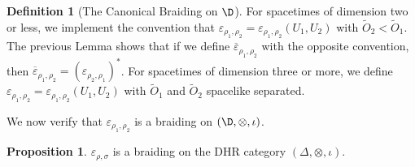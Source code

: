 \documentclass[11pt]{article}
\newenvironment{bxd}%
  {\bigskip\noindent\begin{Sbox}\begin{minipage}{0.9\textwidth} }%
  {\end{minipage}\end{Sbox}\fbox{\TheSbox}\bigskip}%
\theoremstyle{definition}
\newtheorem{prop}[thm]{Proposition}
\theoremstyle{definition}
\newtheorem{defn}[thm]{Definition}
\theoremstyle{remark}
\newcommand{\ve}{\varepsilon}
\def\wt#1{{\tilde #1}}
\def\ol#1{{\overline #1}}
\begin{document}
\begin{bxd}
  \begin{defn}[The Canonical Braiding on $\D$] For spacetimes of dimension two or
    less, we implement the convention that $\ve _{\rho _1,\rho _2}=\ve _{\rho _1,\rho
      _2}(U_1,U_2)$ with $\wt O_2<\wt O_1$.  The previous Lemma shows that if we
    define $\ol\ve _{\rho _1,\rho _2}$ with the opposite convention, then $\ol\ve
    _{\rho _1,\rho _2}=(\ve _{\rho _2,\rho _1})^*$.  For spacetimes of dimension
    three or more, we define $\ve _{\rho _1,\rho _2}=\ve _{\rho _1,\rho _2}(U_1,U_2)$
    with $\wt O_1$ and $\wt O_2$ spacelike separated.
\end{defn} \end{bxd}

We now verify that $\ve _{\rho _1,\rho _2}$ is a braiding on $(\D ,\otimes ,\iota )$.

\begin{prop} $\ve _{\rho ,\sigma}$ is a braiding on the DHR category $(\Delta
  ,\otimes ,\iota )$.
\end{prop}
\end{document}
